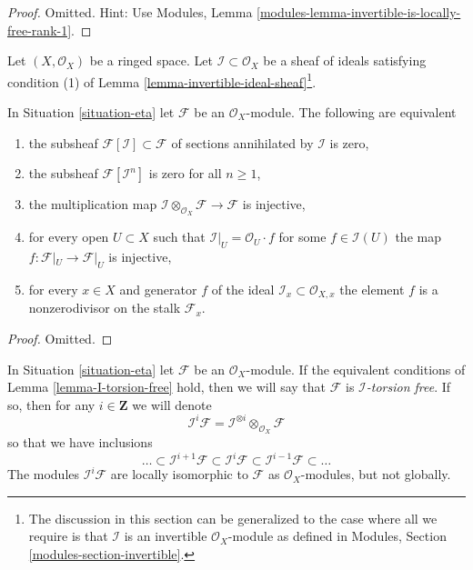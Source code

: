 \begin{proof}
Omitted. Hint: Use Modules, Lemma
\ref{modules-lemma-invertible-is-locally-free-rank-1}.
\end{proof}

\begin{situation}
\label{situation-eta}
Let $(X, \mathcal{O}_X)$ be a ringed space. Let
$\mathcal{I} \subset \mathcal{O}_X$ be a sheaf of ideals
satisfying condition (1) of
Lemma \ref{lemma-invertible-ideal-sheaf}\footnote{The discussion
in this section can be generalized to the case where all we
require is that $\mathcal{I}$ is an invertible $\mathcal{O}_X$-module
as defined in Modules, Section \ref{modules-section-invertible}.}.
\end{situation}

\begin{lemma}
\label{lemma-I-torsion-free}
In Situation \ref{situation-eta}
let $\mathcal{F}$ be an $\mathcal{O}_X$-module.
The following are equivalent
\begin{enumerate}
\item the subsheaf $\mathcal{F}[\mathcal{I}] \subset \mathcal{F}$
of sections annihilated by $\mathcal{I}$ is zero,
\item the subsheaf $\mathcal{F}[\mathcal{I}^n]$ is zero for all $n \geq 1$,
\item the multiplication map
$\mathcal{I} \otimes_{\mathcal{O}_X} \mathcal{F} \to \mathcal{F}$
is injective,
\item for every open $U \subset X$ such that
$\mathcal{I}|_U = \mathcal{O}_U \cdot f$
for some $f \in \mathcal{I}(U)$
the map $f : \mathcal{F}|_U \to \mathcal{F}|_U$ is injective,
\item for every $x \in X$ and generator $f$ of the ideal
$\mathcal{I}_x \subset \mathcal{O}_{X, x}$ the element $f$
is a nonzerodivisor on the stalk $\mathcal{F}_x$.
\end{enumerate}
\end{lemma}

\begin{proof}
Omitted.
\end{proof}

\noindent
In Situation \ref{situation-eta}
let $\mathcal{F}$ be an $\mathcal{O}_X$-module.
If the equivalent conditions of Lemma \ref{lemma-I-torsion-free} hold,
then we will say that $\mathcal{F}$ is {\it $\mathcal{I}$-torsion free}.
If so, then for any $i \in \mathbf{Z}$ we will denote
$$
\mathcal{I}^i\mathcal{F} =
\mathcal{I}^{\otimes i} \otimes_{\mathcal{O}_X} \mathcal{F}
$$
so that we have inclusions
$$
\ldots \subset
\mathcal{I}^{i + 1}\mathcal{F} \subset
\mathcal{I}^i\mathcal{F} \subset
\mathcal{I}^{i - 1}\mathcal{F} \subset \ldots
$$
The modules $\mathcal{I}^i\mathcal{F}$ are locally isomorphic to
$\mathcal{F}$ as $\mathcal{O}_X$-modules, but not globally.

